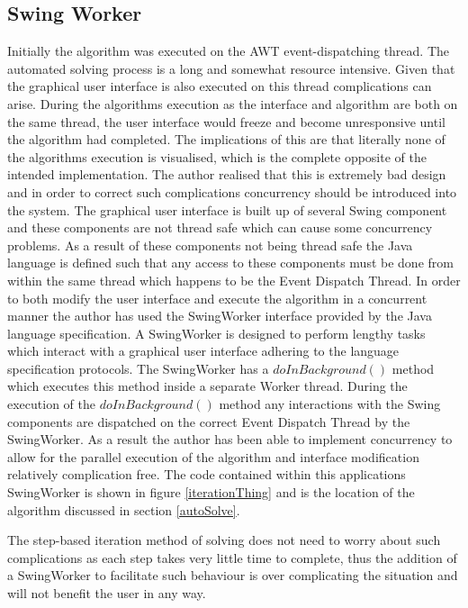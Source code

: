 \subsection{Swing Worker}
\label{swingmeupm8}
Initially the algorithm was executed on the AWT event-dispatching thread. The automated solving process is a long and somewhat resource intensive. Given that the graphical user interface is also executed on this thread complications can arise. During the algorithms execution as the interface and algorithm are both on the same thread, the user interface would freeze and become unresponsive until the algorithm had completed. The implications of this are that literally none of the algorithms execution is visualised, which is the complete opposite of the intended implementation. The author realised that this is extremely bad design and in order to correct such complications concurrency should be introduced into the system. The graphical user interface is built up of several Swing component and these components are not thread safe which can cause some concurrency problems. As a result of these components not being thread safe the Java language is defined such that any access to these components must be done from within the same thread which happens to be the Event Dispatch Thread. In order to both modify the user interface and execute the algorithm in a concurrent manner the author has used the SwingWorker interface provided by the Java language specification. A SwingWorker is designed to perform lengthy tasks which interact with a graphical user interface adhering to the language specification protocols. The SwingWorker has a $doInBackground()$ method which executes this method inside a separate Worker thread. During the execution of the $doInBackground()$ method any interactions with the Swing components are dispatched on the correct Event Dispatch Thread by the SwingWorker. As a result the author has been able to implement concurrency to allow for the parallel execution of the algorithm and interface modification relatively complication free. The code contained within this applications SwingWorker is shown in figure \ref{iterationThing} and is the location of the algorithm discussed in section \ref{autoSolve}. 

The step-based iteration method of solving does not need to worry about such complications as each step takes very little time to complete, thus the addition of a SwingWorker to facilitate such behaviour is over complicating the situation and will not benefit the user in any way.

